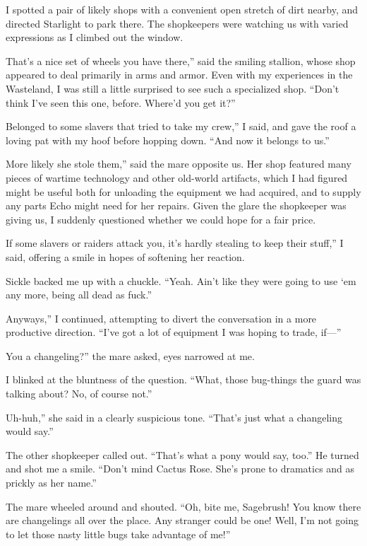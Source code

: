 I spotted a pair of likely shops with a convenient open stretch of dirt nearby, and directed Starlight to park there. The shopkeepers were watching us with varied expressions as I climbed out the window.

\leavevmode{}That’s a nice set of wheels you have there,” said the smiling stallion, whose shop appeared to deal primarily in arms and armor. Even with my experiences in the Wasteland, I was still a little surprised to see such a specialized shop. “Don’t think I’ve seen this one, before. Where’d you get it?”

\leavevmode{}Belonged to some slavers that tried to take my crew,” I said, and gave the roof a loving pat with my hoof before hopping down. “And now it belongs to us.”

\leavevmode{}More likely she stole them,” said the mare opposite us. Her shop featured many pieces of wartime technology and other old-world artifacts, which I had figured might be useful both for unloading the equipment we had acquired, and to supply any parts Echo might need for her repairs. Given the glare the shopkeeper was giving us, I suddenly questioned whether we could hope for a fair price.

\leavevmode{}If some slavers or raiders attack you, it’s hardly stealing to keep their stuff,” I said, offering a smile in hopes of softening her reaction.

Sickle backed me up with a chuckle. “Yeah. Ain’t like they were going to use ‘em any more, being all dead as fuck.”

\leavevmode{}Anyways,” I continued, attempting to divert the conversation in a more productive direction. “I’ve got a lot of equipment I was hoping to trade, if—”

\leavevmode{}You a changeling?” the mare asked, eyes narrowed at me.

I blinked at the bluntness of the question. “What, those bug-things the guard was talking about? No, of course not.”

\leavevmode{}Uh-huh,” she said in a clearly suspicious tone. “That’s just what a changeling would say.”

The other shopkeeper called out. “That’s what a pony would say, too.” He turned and shot me a smile. “Don’t mind Cactus Rose. She’s prone to dramatics and as prickly as her name.”

The mare wheeled around and shouted. “Oh, bite me, Sagebrush! You know there are changelings all over the place. Any stranger could be one! Well, I’m not going to let those nasty little bugs take advantage of me!”

